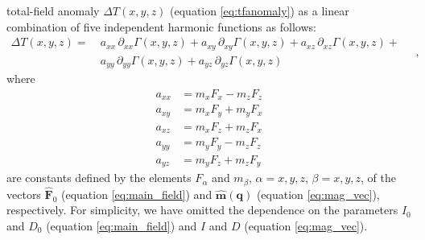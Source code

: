 total-field anomaly $\Delta T(x, y, z)$ (equation \ref{eq:tfanomaly}) as a linear combination 
of five independent harmonic functions as follows:
\begin{equation}
	\begin{split}
		\Delta T(x, y, z) = \:
		& a_{xx} \, \partial_{xx} \Gamma(x, y, z) + 
		a_{xy} \, \partial_{xy} \Gamma(x, y, z) + 
		a_{xz} \, \partial_{xz} \Gamma(x, y, z) + \\
		& a_{yy} \, \partial_{yy} \Gamma(x, y, z) + 
		a_{yz} \, \partial_{yz} \Gamma(x, y, z)
	\end{split} \quad ,
	\label{eq:tfanomaly-alternative}
\end{equation}
where
\begin{equation}
	\begin{split}
		a_{xx} &= m_{x} F_{x} - m_{z} F_{z} \\
		a_{xy} &= m_{x} F_{y} + m_{y} F_{x} \\
		a_{xz} &= m_{x} F_{z} + m_{z} F_{x} \\
		a_{yy} &= m_{y} F_{y} - m_{z} F_{z} \\
		a_{yz} &= m_{y} F_{z} + m_{z} F_{y}
	\end{split}
\label{eq:a-coefficients}
\end{equation}
are constants defined by the elements $F_{\alpha}$ and $m_{\beta}$, 
$\alpha = x, y, z$, $\beta = x, y, z$, 
of the vectors $\hat{\mathbf{F}}_{0}$ (equation \ref{eq:main_field}) and
$\hat{\mathbf{m}}(\mathbf{q})$ (equation \ref{eq:mag_vec}), respectively.
For simplicity, we have omitted the dependence on the 
parameters $I_{0}$ and $D_{0}$ (equation \ref{eq:main_field}) and 
$I$ and $D$ (equation \ref{eq:mag_vec}).


